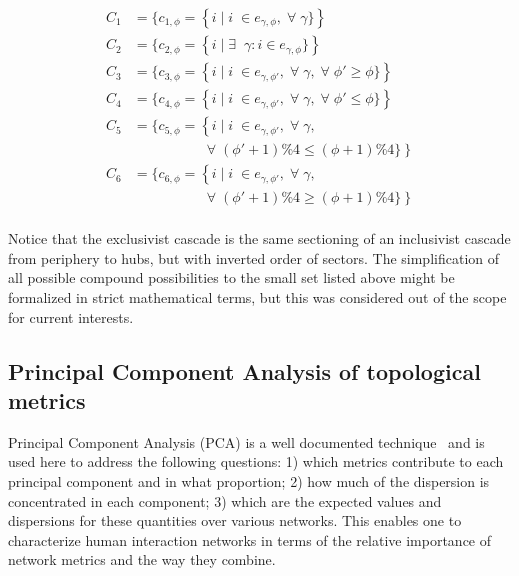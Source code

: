 \begin{equation}
\begin{split}
C_1&=\{c_{1,\phi}=\left\{i\mid i\;\in e_{\gamma,\phi}, \;\forall\; \gamma\}\right\} \\
C_2&=\{c_{2,\phi}=\left\{i\mid \exists \;\;\gamma: i \in e_{\gamma,\phi}\}\right\} \\
C_3&=\{c_{3,\phi}=\left\{i\mid i\;\in e_{\gamma,\phi'}, \;\forall\; \gamma,\;\forall\;\phi'\geq \phi\}\right\} \\
C_4&=\{c_{4,\phi}=\left\{i\mid i\;\in e_{\gamma,\phi'}, \;\forall\; \gamma,\;\forall\;\phi'\leq \phi\}\right\} \\
C_5&=\{c_{5,\phi}=\left\{i\mid i\;\in e_{\gamma,\phi'}, \;\forall\; \gamma,\right.\\
&\;\;\;\;\;\;\;\;\;\;\;\;\;\;\;\;\;\; \left.\;\forall\;(\phi'+1)\%4\leq (\phi+1)\%4\}\right\} \\
C_6&=\{c_{6,\phi}=\left\{i\mid i\;\in e_{\gamma,\phi'}, \;\forall\; \gamma,\right.\\
&\;\;\;\;\;\;\;\;\;\;\;\;\;\;\;\;\;\; \left.\;\forall\;(\phi'+1)\%4\geq (\phi+1)\%4\}\right\} \\
\end{split}
\end{equation}

Notice that the exclusivist cascade is the same sectioning of an inclusivist cascade from periphery to hubs, but with inverted order of sectors. 
The simplification of all possible compound possibilities to the small set listed above might be formalized in strict mathematical terms, but this was considered out of the scope for current interests.


\subsection{Principal Component Analysis of topological metrics}\label{sec:pca}
Principal Component Analysis (PCA) is a well documented technique~\cite{pca} and is used here to address the following questions: 1) which metrics contribute to each principal component and in what proportion; 2) how much of the dispersion is concentrated in each component; 3) which are the expected values and dispersions for these quantities over various networks. This enables one to characterize human interaction networks in terms of the relative importance of network metrics and the way they combine.

